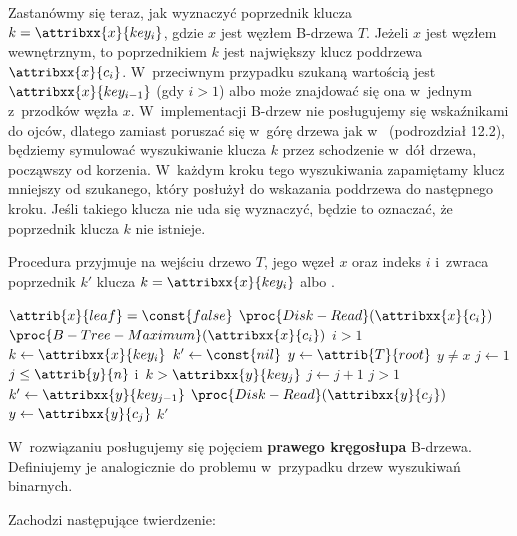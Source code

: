 Zastanówmy się teraz, jak wyznaczyć poprzednik klucza $k=\attribxx{x}{key_i}$, gdzie $x$ jest węzłem B-drzewa $T$.
Jeżeli $x$ jest węzłem wewnętrznym, to poprzednikiem $k$ jest największy klucz poddrzewa $\attribxx{x}{c_i}$.
W~przeciwnym przypadku szukaną wartością jest $\attribxx{x}{key_{i-1}}$ (gdy $i>1$) albo może znajdować się ona w~jednym z~przodków węzła $x$.
W~implementacji B-drzew nie posługujemy się wskaźnikami do ojców, dlatego zamiast poruszać się w~górę drzewa jak w~ (podrozdział 12.2), będziemy symulować wyszukiwanie klucza $k$ przez schodzenie w~dół drzewa, począwszy od korzenia.
W~każdym kroku tego wyszukiwania zapamiętamy klucz mniejszy od szukanego, który posłużył do wskazania poddrzewa do następnego kroku.
Jeśli takiego klucza nie uda się wyznaczyć, będzie to oznaczać, że poprzednik klucza $k$ nie istnieje.

Procedura przyjmuje na wejściu drzewo $T$, jego węzeł $x$ oraz indeks $i$ i~zwraca poprzednik $k'$ klucza $k=\attribxx{x}{key_i}$ albo .
\begin{codebox}
\li \If $\attrib{x}{leaf}=\const{false}$
\li   \Then $\proc{Disk-Read}(\attribxx{x}{c_i})$
\li     \Return $\proc{B-Tree-Maximum}(\attribxx{x}{c_i})$
    \End
\li \If $i>1$
\li   \Then \Return {}
    \End
\li $k\gets\attribxx{x}{key_i}$
\li $k'\gets\const{nil}$
\li $y\gets\attrib{T}{root}$
\li \While $y\ne x$
\li   \Do $j\gets1$
\li   \While $j\le\attrib{y}{n}$ i~$k>\attribxx{y}{key_j}$
\li     \Do $j\gets j+1$
      \End
\li   \If $j>1$
\li     \Then $k'\gets\attribxx{y}{key_{j-1}}$
      \End
\li   $\proc{Disk-Read}(\attribxx{y}{c_j})$
\li   $y\gets\attribxx{y}{c_j}$
    \End
\li \Return $k'$
\end{codebox}

\exercise %
W~rozwiązaniu posługujemy się pojęciem \textbf{prawego kręgosłupa} B-drzewa.
Definiujemy je analogicznie do problemu  w~przypadku drzew wyszukiwań binarnych.

Zachodzi następujące twierdzenie:

